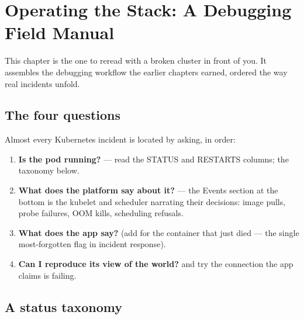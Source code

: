 \chapter{Operating the Stack: A Debugging Field Manual}
\label{ch:operations}

This chapter is the one to reread with a broken cluster in front of
you. It assembles the debugging workflow the earlier chapters earned,
ordered the way real incidents unfold.

\section{The four questions}

Almost every Kubernetes incident is located by asking, in order:

\begin{enumerate}
  \item \textbf{Is the pod running?}  ---
  read the STATUS and RESTARTS columns; the taxonomy below.
  \item \textbf{What does the platform say about it?}
   --- the Events section at the
  bottom is the kubelet and scheduler narrating their decisions:
  image pulls, probe failures, OOM kills, scheduling refusals.
  \item \textbf{What does the app say?}  (add  for the container that just died ---
  the single most-forgotten flag in incident response).
  \item \textbf{Can I reproduce its view of the world?}
   and try the connection the
  app claims is failing.
\end{enumerate}

\section{A status taxonomy}


